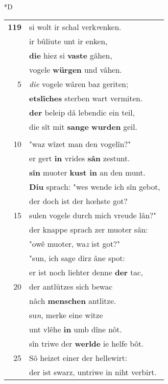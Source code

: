 \documentclass[8pt,a4paper,notitlepage]{article}
\begin{document}
\begin{table}[ht]
\begin{minipage}[t]{0.5\linewidth}
\small
\begin{center}*D
\end{center}
\begin{tabular}{rl}
\textbf{119} & si wolt ir schal verk\textit{r}enken.\\ 
 & ir bûliute unt ir enken,\\ 
 & \textbf{die} hiez si \textbf{vaste} gâhen,\\ 
 & vogele \textbf{würgen} und vâhen.\\ 
5 & \textit{die} vogele wâren baz geriten;\\ 
 & \textbf{etslîches} sterben wart vermiten.\\ 
 & \textbf{der} beleip dâ lebendic ein teil,\\ 
 & die sît mit \textbf{sange} \textbf{wurden} geil.\\ 
 & \textit{\begin{large}D\end{large}}er knappe sprach zer künegîn:\\ 
10 & "waz wîzet man den vogelîn?"\\ 
 & er gert \textbf{in} vrides \textbf{sân} zestunt.\\ 
 & \textbf{sîn} muoter \textbf{kust in} an den munt.\\ 
 & \textbf{Diu} sprach: "wes wende ich sîn gebot,\\ 
 & der doch ist der hœhste got?\\ 
15 & sulen vogele durch mich vreude lân?"\\ 
 & der knappe sprach zer muoter sân:\\ 
 & "owê muoter, wa\textit{z} ist got?"\\ 
 & "sun, ich sage dirz âne spot:\\ 
 & er ist noch liehter denne \textbf{der} tac,\\ 
20 & der antlützes sich bewac\\ 
 & nâch \textbf{menschen} antlitze.\\ 
 & su\textit{n}, merke eine witze\\ 
 & unt vlêhe \textbf{in} umb dîne nôt.\\ 
 & sîn triwe der \textbf{werlde} ie helfe bôt.\\ 
25 & Sô heizet einer der hellewirt:\\ 
 & der ist swarz, untriwe in niht verbirt.\\ 

\end{tabular}
\end{minipage}
\end{table}
\end{document}
